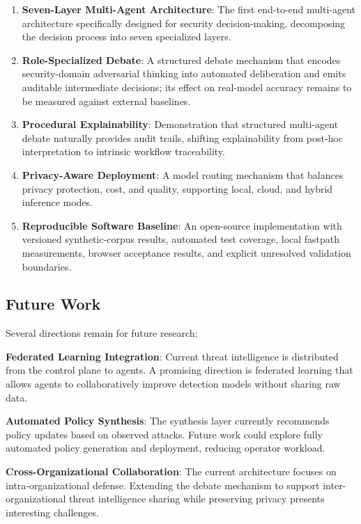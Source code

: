 \begin{enumerate}
    \item \textbf{Seven-Layer Multi-Agent Architecture}: The first end-to-end multi-agent architecture specifically designed for security decision-making, decomposing the decision process into seven specialized layers.

    \item \textbf{Role-Specialized Debate}: A structured debate mechanism that encodes security-domain adversarial thinking into automated deliberation and emits auditable intermediate decisions; its effect on real-model accuracy remains to be measured against external baselines.

    \item \textbf{Procedural Explainability}: Demonstration that structured multi-agent debate naturally provides audit trails, shifting explainability from post-hoc interpretation to intrinsic workflow traceability.

    \item \textbf{Privacy-Aware Deployment}: A model routing mechanism that balances privacy protection, cost, and quality, supporting local, cloud, and hybrid inference modes.

    \item \textbf{Reproducible Software Baseline}: An open-source implementation with versioned synthetic-corpus results, automated test coverage, local fastpath measurements, browser acceptance results, and explicit unresolved validation boundaries.
\end{enumerate}

\subsection{Future Work}

Several directions remain for future research:

\textbf{Federated Learning Integration}: Current threat intelligence is distributed from the control plane to agents. A promising direction is federated learning that allows agents to collaboratively improve detection models without sharing raw data.

\textbf{Automated Policy Synthesis}: The synthesis layer currently recommends policy updates based on observed attacks. Future work could explore fully automated policy generation and deployment, reducing operator workload.

\textbf{Cross-Organizational Collaboration}: The current architecture focuses on intra-organizational defense. Extending the debate mechanism to support inter-organizational threat intelligence sharing while preserving privacy presents interesting challenges.


